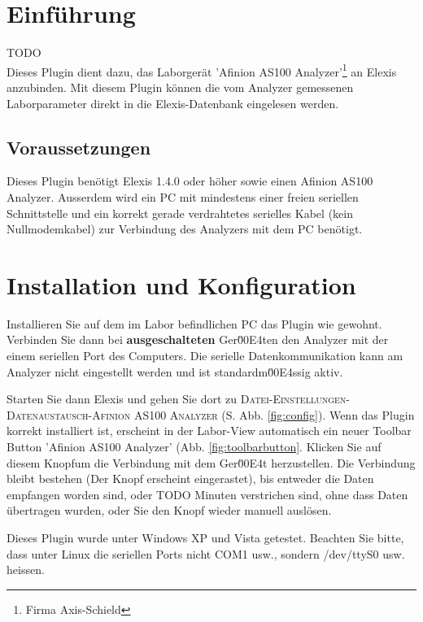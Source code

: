 \documentclass[a4paper]{scrartcl}
\begin{document}
\section{Einführung}
TODO\\
Dieses Plugin dient dazu, das Laborgerät 'Afinion AS100 Analyzer'\footnote{Firma Axis-Schield} an Elexis anzubinden. Mit diesem Plugin können die vom Analyzer gemessenen Laborparameter direkt in die Elexis-Datenbank eingelesen werden.

\subsection{Voraussetzungen}
Dieses Plugin benötigt Elexis 1.4.0 oder höher sowie einen Afinion AS100 Analyzer. Ausserdem wird ein PC mit mindestens einer freien seriellen Schnittstelle und ein korrekt gerade verdrahtetes serielles Kabel (kein Nullmodemkabel) zur Verbindung des Analyzers mit dem PC benötigt.

\section{Installation und Konfiguration}
Installieren Sie auf dem im Labor befindlichen PC das Plugin wie gewohnt. Verbinden Sie dann bei \textbf{ausgeschalteten} Ger\u00E4ten den Analyzer mit der einem seriellen Port des Computers. Die serielle Datenkommunikation kann am Analyzer nicht eingestellt werden und ist standardm\u00E4ssig aktiv.

Starten Sie dann Elexis und gehen Sie dort zu \textsc{Datei-Einstellungen-Datenaustausch-Afinion AS100 Analyzer} (S. Abb. \ref{fig:config}).
%
%
Wenn das Plugin korrekt installiert ist, erscheint in der Labor-View automatisch ein neuer Toolbar Button 'Afinion AS100 Analyzer' (Abb. \ref{fig:toolbarbutton}. Klicken Sie auf diesem Knopfum die Verbindung mit dem Ger\u00E4t herzustellen. Die Verbindung bleibt bestehen (Der Knopf erscheint eingerastet), bis entweder die Daten empfangen worden sind, oder TODO Minuten verstrichen sind, ohne dass Daten übertragen wurden, oder Sie den Knopf wieder manuell auslösen.

Dieses Plugin wurde unter Windows XP und Vista getestet. Beachten Sie bitte, dass unter Linux die seriellen Ports nicht COM1 usw., sondern /dev/ttyS0 usw. heissen.
\end{document}

